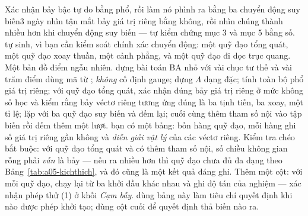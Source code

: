 \documentclass[../../vslam.tex]{subfiles}
\begin{document}
\begin{ungdung}
\end{ungdung}

\begin{duan}{Xác nhận bảy bậc tự do bằng phổ, rồi làm nó phình ra bằng ba chuyển động suy biến}{3 ngày}
\dmt nhìn tận mắt bảy giá trị riêng bằng không, rồi nhìn chúng thành nhiều hơn khi chuyển động suy biến --- tự kiểm chứng mục 3 và mục 5 bằng số.
\ddl tự sinh, vì bạn cần kiểm soát chính xác chuyển động: một quỹ đạo tổng quát, một quỹ đạo xoay thuần, một cảnh phẳng, và một quỹ đạo đi dọc trục quang. Một bản đồ điểm ngẫu nhiên.
\dbc dựng bài toán BA nhỏ với vài chục tư thế và vài trăm điểm dùng mã từ ; \emph{không} cố định gauge; dựng \(\Lambda\) dạng đặc; tính toàn bộ phổ giá trị riêng; với quỹ đạo tổng quát, xác nhận đúng bảy giá trị riêng ở mức không số học và kiểm rằng bảy véctơ riêng tương ứng đúng là ba tịnh tiến, ba xoay, một tỉ lệ; lặp với ba quỹ đạo suy biến và đếm lại; cuối cùng thêm tham số nội vào tập biến rồi đếm thêm một lượt.
\dxk bạn có một bảng: bốn hàng quỹ đạo, mỗi hàng ghi số giá trị riêng gần không và \emph{diễn giải vật lý} của các véctơ riêng. Kiểm tra chéo bắt buộc: với quỹ đạo tổng quát và có thêm tham số nội, số chiều không gian rỗng phải \emph{vẫn} là bảy --- nếu ra nhiều hơn thì quỹ đạo chưa đủ đa dạng theo Bảng~\ref{tab:a05-kichthich}, và đó cũng là một kết quả đáng ghi. Thêm một cột: với mỗi quỹ đạo, chạy lại từ ba khởi đầu khác nhau và ghi độ tán của nghiệm --- xác nhận phép thử (1) ở khối \emph{Cạm bẫy}.
\dnv {} dùng bảng này làm tiêu chí quyết định khi nào được phép khởi tạo;  dùng cột cuối để quyết định thả biến nào ra.
\end{duan}
\end{document}
